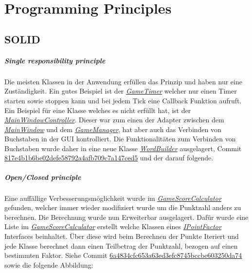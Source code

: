 \chapter{Programming Principles}
\section{SOLID}
\paragraph{Single responsibility principle}
Die meisten Klassen in der Anwendung erfüllen das Prinzip und haben nur eine Zuständigkeit. Ein gutes Beispiel ist der \href{https://github.com/EinToni/Wortfinder/blob/main/Wortfinder/GameTimer.cs}{\textit{GameTimer}} welcher nur einen Timer starten sowie stoppen kann und bei jedem Tick eine Callback Funktion aufruft. Ein Beispiel für eine Klasse welches es nicht erfüllt hat, ist der \href{https://github.com/EinToni/Wortfinder/blob/main/Wortfinder/MainWindowController.cs}{\textit{MainWindowController}}. Dieser war zum einen der Adapter zwischen dem \href{https://github.com/EinToni/Wortfinder/blob/main/Wortfinder/MainWindow.xaml.cs}{\textit{MainWindow}} und dem \href{https://github.com/EinToni/Wortfinder/blob/main/Wortfinder/GameManager.cs}{\textit{GameManager}}, hat aber auch das Verbinden von Buchstaben in der GUI kontrolliert. Die Funktionalitäten zum Verbinden von Buchstaben wurde daher in eine neue Klasse \href{https://github.com/EinToni/Wortfinder/blob/main/Wortfinder/WordBuilder.cs}{\textit{WordBuilder}} ausgelagert, Commit \href{https://github.com/EinToni/Wortfinder/commit/817e4b1b6be02defe58792a4afb709c7a147ced5}{817e4b1b6be02defe58792a4afb709c7a147ced5} und der darauf folgende. 


\paragraph{Open/Closed principle}
Eine auffällige Verbesserungsmöglichkeit wurde im \href{https://github.com/EinToni/Wortfinder/blob/main/Wortfinder/GameScoreCalculator.cs}{\textit{GameScoreCalculator}} gefunden, welcher immer wieder modifiziert wurde um die Punktzahl anders zu berechnen. Die Berechnung wurde nun Erweiterbar ausgelagert. Dafür wurde eine Liste im \href{https://github.com/EinToni/Wortfinder/blob/main/Wortfinder/GameScoreCalculator.cs}{\textit{GameScoreCalculator}} erstellt welche Klassen eines \href{https://github.com/EinToni/Wortfinder/blob/main/Wortfinder/Interfaces/IPointFactor.cs}{\textit{IPointFactor}} Interfaces beinhaltet. Über diese wird beim Berechnen der Punkte Iteriert und jede Klasse berechnet dann einen Teilbetrag der Punktzahl, bezogen auf einen bestimmten Faktor. Siehe Commit \href{https://github.com/EinToni/Wortfinder/commit/6a4834cfc653a63ed3efc8745bccbe603250da74}{6a4834cfc653a63ed3efc8745bccbe603250da74} sowie die folgende Abbildung:

